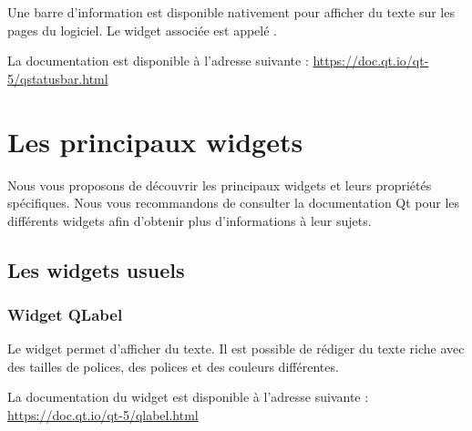 Une barre d'information est disponible nativement pour afficher du texte sur les pages du logiciel. \newline Le widget associée est appelé .




La documentation est disponible à l'adresse suivante : \newline \url{https://doc.qt.io/qt-5/qstatusbar.html}


\chapter{Les principaux widgets}

Nous vous proposons de découvrir les principaux widgets et leurs propriétés spécifiques.
\newline
Nous vous recommandons de consulter la documentation Qt pour les différents widgets afin d'obtenir plus d'informations à leur sujets.

\section{Les widgets usuels}
\subsection{Widget QLabel}

Le widget  permet d'afficher du texte. 
Il est possible de rédiger du texte riche avec des tailles de polices, des polices et des couleurs différentes. \newline \newline


La documentation du widget est disponible à l'adresse suivante : \newline  \url{https://doc.qt.io/qt-5/qlabel.html}


